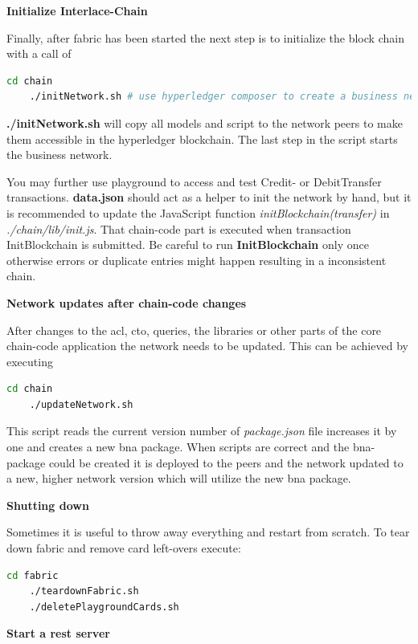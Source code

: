 \textbf{Initialize Interlace-Chain}

Finally, after fabric has been started the next step is to initialize the block chain with a call of

\begin{lstlisting}[language=bash]
	cd chain
	./initNetwork.sh # use hyperledger composer to create a business network and deploy it
\end{lstlisting}

\textbf{./initNetwork.sh} will copy all models and script to the network peers to make them accessible in the hyperledger blockchain. The last step in the script starts the business network.

You may further use playground to access and test Credit- or DebitTransfer transactions. \textbf{data.json} should act as a helper to init the network by hand, but it is recommended to update the JavaScript function \textit{initBlockchain(transfer)} in \textit{./chain/lib/init.js}. That chain-code part is executed when transaction InitBlockchain is submitted. Be careful to run \textbf{InitBlockchain} only once otherwise errors or duplicate entries might happen resulting in a inconsistent chain.

\textbf{Network updates after chain-code changes}

After changes to the acl, cto, queries, the libraries or other parts of the core chain-code application the network needs to be updated. This can be achieved by executing

\begin{lstlisting}[language=bash]
	cd chain
	./updateNetwork.sh
\end{lstlisting}

This script reads the current version number of \textit{package.json} file increases it by one and creates a new bna package. When scripts are correct and the bna-package could be created it is deployed to the peers and the network updated to a new, higher network version which will utilize the new bna package.

\textbf{Shutting down}

Sometimes it is useful to throw away everything and restart from scratch. To tear down fabric and remove card left-overs execute:

\begin{lstlisting}[language=bash]
	cd fabric
	./teardownFabric.sh
	./deletePlaygroundCards.sh
\end{lstlisting}

\textbf{Start a rest server}

